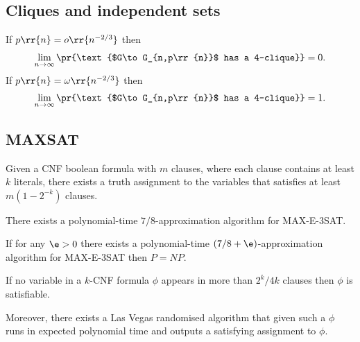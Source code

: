 \documentclass{article}
\begin{document}
\subsection{Cliques and independent sets}

\begin{theorem}
  If $p\rr{n}=o\rr{n^{-2/3}}$ then
  \begin{align*}
    \lim_{n\to\infty} \pr{\text{$G\to G_{n,p\rr{n}}$ has a 4-clique}}=0.
  \end{align*}
  If $p\rr{n}=\omega\rr{n^{-2/3}}$ then
  \begin{align*}
    \lim_{n\to\infty} \pr{\text{$G\to G_{n,p\rr{n}}$ has a 4-clique}}=1.
  \end{align*}
\end{theorem}

\subsection{MAXSAT}\label{sec:maxsat}

\begin{theorem}
  Given a CNF boolean formula with $m$ clauses, where each clause contains at least $k$ literals,
  there exists a truth assignment to the variables that satisfies at least $m(1-2^{-k})$ clauses.
\end{theorem}

\begin{lemma}
  There exists a polynomial-time $7/8$-approximation algorithm for MAX-E-3SAT.
\end{lemma}

\begin{theorem}[Hastad]
  If for any $\e>0$ there exists a polynomial-time $(7/8+\e)$-approximation algorithm for
  MAX-E-3SAT then $P=NP$.
\end{theorem}

\begin{theorem}[Moser]
  If no variable in a $k$-CNF formula $\phi$ appears in more than $2^k/4k$ clauses then
  $\phi$ is satisfiable.

  Moreover, there exists a Las Vegas randomised algorithm that given such a $\phi$ runs in
  expected polynomial time and outputs a satisfying assignment to $\phi$.
\end{theorem}
\end{document}
